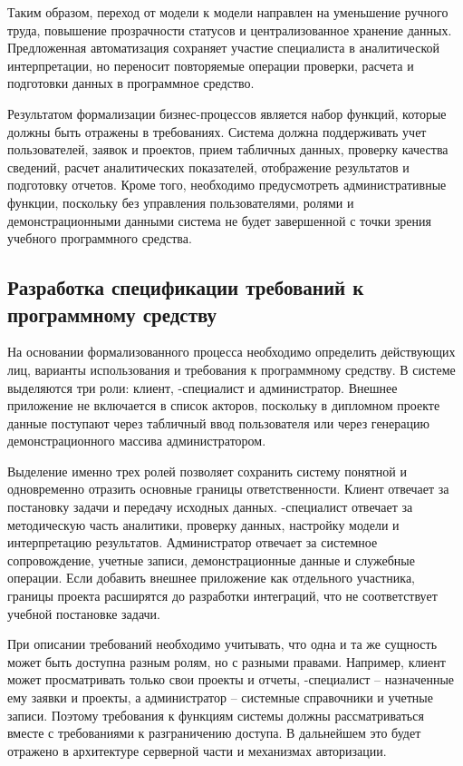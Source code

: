 Таким образом, переход от модели  к модели  направлен на уменьшение ручного труда, повышение прозрачности статусов и централизованное хранение данных. Предложенная автоматизация сохраняет участие специалиста в аналитической интерпретации, но переносит повторяемые операции проверки, расчета и подготовки данных в программное средство.

Результатом формализации бизнес-процессов является набор функций, которые должны быть отражены в требованиях. Система должна поддерживать учет пользователей, заявок и проектов, прием табличных данных, проверку качества сведений, расчет аналитических показателей, отображение результатов и подготовку отчетов. Кроме того, необходимо предусмотреть административные функции, поскольку без управления пользователями, ролями и демонстрационными данными система не будет завершенной с точки зрения учебного программного средства.

\subsection{Разработка спецификации требований к программному средству}

На основании формализованного процесса необходимо определить действующих лиц, варианты использования и требования к программному средству. В системе выделяются три роли: клиент, -специалист и администратор. Внешнее  приложение не включается в список акторов, поскольку в дипломном проекте данные поступают через табличный ввод пользователя или через генерацию демонстрационного массива администратором.

Выделение именно трех ролей позволяет сохранить систему понятной и одновременно отразить основные границы ответственности. Клиент отвечает за постановку задачи и передачу исходных данных. -специалист отвечает за методическую часть аналитики, проверку данных, настройку модели и интерпретацию результатов. Администратор отвечает за системное сопровождение, учетные записи, демонстрационные данные и служебные операции. Если добавить внешнее приложение как отдельного участника, границы проекта расширятся до разработки интеграций, что не соответствует учебной постановке задачи.

При описании требований необходимо учитывать, что одна и та же сущность может быть доступна разным ролям, но с разными правами. Например, клиент может просматривать только свои проекты и отчеты, -специалист -- назначенные ему заявки и проекты, а администратор -- системные справочники и учетные записи. Поэтому требования к функциям системы должны рассматриваться вместе с требованиями к разграничению доступа. В дальнейшем это будет отражено в архитектуре серверной части и механизмах авторизации.

